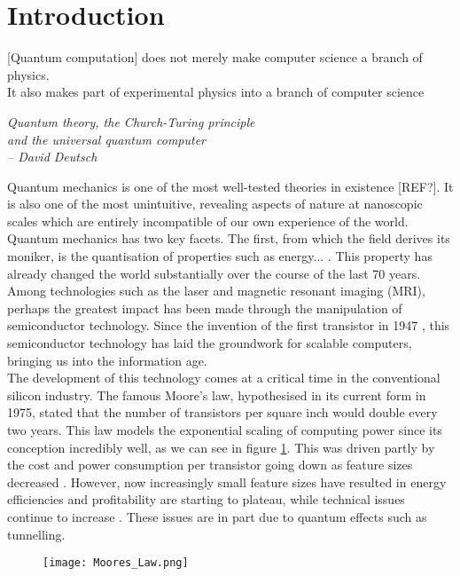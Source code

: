 \section{Introduction}


\epigraph{[Quantum computation] does not merely make computer science
a branch of physics. \\ It also makes part of experimental physics into a branch of computer science}{\textit{Quantum theory, the Church-Turing principle \\ and the universal
quantum computer \\ -- David Deutsch}}

Quantum mechanics is one of the most well-tested theories in existence [REF?]. It is also one of the most unintuitive, revealing aspects of nature at nanoscopic scales which are entirely incompatible of our own experience of the world. \\

Quantum mechanics has two key facets. The first, from which the field derives its moniker, is the quantisation of properties such as energy... . This property has already changed the world substantially over the course of the last 70 years. Among technologies such as the laser and magnetic resonant imaging (MRI), perhaps the greatest impact has been made through the manipulation of semiconductor technology. Since the invention of the first transistor in 1947 \cite{Bardeen1948}, this semiconductor technology has laid the groundwork for scalable computers, bringing us into the information age. \\

The development of this technology comes at a critical time in the conventional silicon industry. The famous Moore's law, hypothesised in its current form in 1975, stated that the number of transistors per square inch would double every two years. This law models the exponential scaling of computing power since its conception incredibly well, as we can see in figure \ref{Moore's_Law_fig}. This was driven partly by the cost and power consumption per transistor going down as feature sizes decreased \cite{MooresLawEconomist}.  However, now increasingly small feature sizes have resulted in energy efficiencies and profitability are starting to plateau, while technical issues continue to increase . These issues are in part due to quantum effects such as tunnelling.  \\

\begin{figure}[h!]\label{Moore's_Law_fig}
\centering
\texttt{[image: Moores\_Law.png]}
\end{figure}


